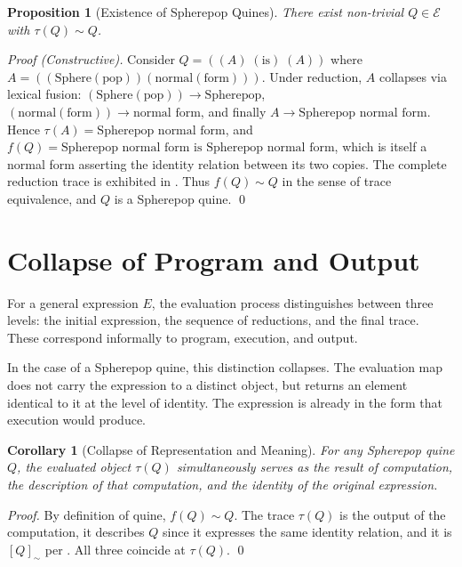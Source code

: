 \documentclass[12pt, oneside]{amsbook}
\theoremstyle{plain}
\newtheorem{proposition}[theorem]{Proposition}
\newtheorem{corollary}[theorem]{Corollary}
\theoremstyle{definition}
\theoremstyle{remark}
\newcommand{\Expr}{\mathcal{E}}
\newcommand{\evalf}{f}
\newcommand{\trace}{\tau}
\newcommand{\tequiv}{\sim}
\begin{document}
\begin{proposition}[Existence of Spherepop Quines]
\label{prop:sp-quines-exist}
  There exist non-trivial $Q \in \Expr$ with $\trace(Q) \tequiv Q$.
\end{proposition}

\begin{proof}[Proof (Constructive)]
Consider $Q = ((A)\;(\text{is})\;(A))$ where
$A = ((\text{Sphere}(\text{pop}))(\text{normal}(\text{form})))$.
Under reduction, $A$ collapses via lexical fusion:
$(\text{Sphere}(\text{pop})) \to \text{Spherepop}$,
$(\text{normal}(\text{form})) \to \text{normal form}$, and finally
$A \to \text{Spherepop normal form}$.
Hence $\trace(A) = \text{Spherepop normal form}$, and
$\evalf(Q) = \text{Spherepop normal form is Spherepop normal form}$,
which is itself a normal form asserting the identity relation between its two
copies. The complete reduction trace is exhibited in .
Thus $\evalf(Q) \tequiv Q$ in the sense of trace equivalence, and $Q$ is a
Spherepop quine. \qed
\end{proof}

\section{Collapse of Program and Output}
\label{sec:fixedpoints:collapse}

For a general expression $E$, the evaluation process distinguishes between
three levels: the initial expression, the sequence of reductions, and the final
trace. These correspond informally to program, execution, and output.

In the case of a Spherepop quine, this distinction collapses. The evaluation
map does not carry the expression to a distinct object, but returns an element
identical to it at the level of identity. The expression is already in the form
that execution would produce.

\begin{corollary}[Collapse of Representation and Meaning]
\label{cor:collapse-rep-meaning}
  For any Spherepop quine $Q$, the evaluated object $\trace(Q)$ simultaneously
  serves as the result of computation, the description of that computation, and
  the identity of the original expression.
\end{corollary}

\begin{proof}
By definition of quine, $\evalf(Q) \tequiv Q$. The trace $\trace(Q)$ is the
output of the computation, it describes $Q$ since it expresses the same
identity relation, and it is $[Q]_{\tequiv}$ per . All three
coincide at $\trace(Q)$. \qed
\end{proof}
\end{document}
